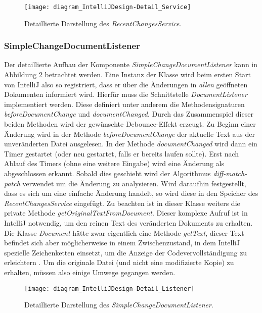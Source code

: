 \begin{figure}
    \centering
    \texttt{[image: diagram\_IntelliJDesign-Detail\_Service]}
    \caption{Detaillierte Darstellung des \emph{RecentChangesService}.}
    \label{fig:diagram_IntelliJDesign-Detail_Service}
\end{figure}

\subsubsection{SimpleChangeDocumentListener}

Der detaillierte Aufbau der Komponente \emph{SimpleChangeDocumentListener}
kann in Abbildung \ref{fig:diagram_IntelliJDesign-Detail_Listener} betrachtet werden.
Eine Instanz der Klasse wird beim ersten Start von IntelliJ also so registriert, 
dass er über die Änderungen in \emph{allen} geöffneten Dokumenten informiert wird. 
Hierfür muss die Schnittstelle \emph{DocumentListener} implementiert werden.
Diese definiert unter anderem die Methodensignaturen \emph{beforeDocumentChange}
und \emph{documentChanged}. Durch das Zusammenspiel dieser beiden Methoden
wird der gewünschte Debounce-Effekt erzeugt. Zu Beginn einer Änderung
wird in der Methode \emph{beforeDocumentChange} der aktuelle Text aus der 
unveränderten Datei ausgelesen. In der Methode \emph{documentChanged} wird
dann ein Timer gestartet (oder neu gestartet, falls er bereits laufen sollte).
Erst nach Ablauf des Timers (ohne eine weitere Eingabe) wird
eine Änderung als abgeschlossen erkannt. Sobald dies geschieht wird 
der Algorithmus \emph{diff-match-patch} verwendet um die Änderung zu analysieren.
Wird daraufhin festgestellt, dass es sich um eine einfache Änderung handelt,
so wird diese in den Speicher des \emph{RecentChangesService} eingefügt.
Zu beachten ist in dieser Klasse weiters die private Methode 
\emph{getOriginalTextFromDocument}. Dieser komplexe Aufruf
ist in IntelliJ notwendig, um den reinen Text des veränderten Dokuments
zu erhalten. Die Klasse \emph{Document} hätte zwar eigentlich
eine Methode \emph{getText}, dieser Text befindet sich aber möglicherweise
in einem Zwischenzustand, in dem IntelliJ spezielle Zeichenketten 
einsetzt, um die Anzeige der Codevervollständigung zu erleichtern
\cite{IntelliJTheDreadedString,IntelliJGitHubCompletionUtilCore}.
Um die originale Datei (und nicht eine modifizierte Kopie) zu erhalten,
müssen also einige Umwege gegangen werden.

\begin{figure}
    \centering
    \texttt{[image: diagram\_IntelliJDesign-Detail\_Listener]}
    \caption{Detaillierte Darstellung des \emph{SimpleChangeDocumentListener}.}
    \label{fig:diagram_IntelliJDesign-Detail_Listener}
\end{figure}

